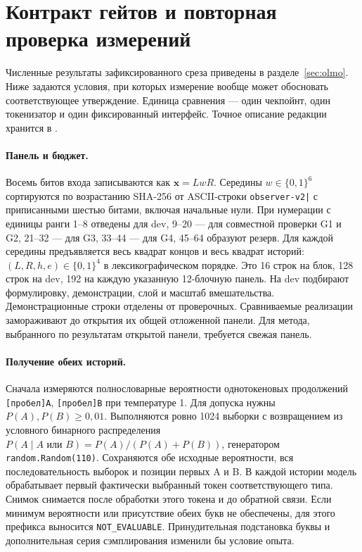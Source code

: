 \section{Контракт гейтов и повторная проверка измерений}
\label{app:gates}

Численные результаты зафиксированного среза приведены в
разделе~\ref{sec:olmo}. Ниже задаются условия, при которых измерение
вообще может обосновать соответствующее утверждение. Единица сравнения ---
один чекпойнт, один токенизатор и один фиксированный интерфейс.
Точное описание редакции хранится в
.

\paragraph{Панель и бюджет.}
Восемь битов входа записываются как $\mathbf{x}=LwR$.
Середины $w\in\{0,1\}^6$ сортируются по возрастанию SHA-256 от ASCII-строки
\verb!observer-v2|! с приписанными шестью битами, включая начальные нули.
При нумерации с единицы ранги 1--8 отведены для dev, 9--20 --- для
совместной проверки G1 и G2, 21--32 --- для G3, 33--44 --- для G4,
45--64 образуют резерв. Для каждой середины предъявляется весь квадрат
концов и весь квадрат историй: $(L,R,h,e)\in\{0,1\}^4$ в лексикографическом
порядке. Это 16 строк на блок, 128 строк на dev, 192 на каждую указанную
12-блочную панель. На dev подбирают формулировку, демонстрации, слой и
масштаб вмешательства. Демонстрационные строки отделены от проверочных.
Сравниваемые реализации замораживают до открытия их общей отложенной панели.
Для метода, выбранного по результатам открытой панели, требуется свежая
панель.

\paragraph{Получение обеих историй.}
Сначала измеряются полнословарные вероятности однотокеновых продолжений
\texttt{[пробел]A}, \texttt{[пробел]B} при температуре 1.
Для допуска нужны $P(A),P(B)\ge 0{,}01$. Выполняются ровно 1024 выборки
с возвращением из условного бинарного распределения
$P(A\mid A\text{ или }B)=P(A)/(P(A)+P(B))$, генератором
\texttt{random.Random(110)}. Сохраняются обе исходные вероятности, вся
последовательность выборок и позиции первых A и B. В каждой истории модель
обрабатывает первый фактически выбранный токен соответствующего типа.
Снимок снимается после обработки этого токена и до обратной связи. Если
минимум вероятности или присутствие обеих букв не обеспечены, для этого
префикса выносится \texttt{NOT\_EVALUABLE}. Принудительная подстановка
буквы и дополнительная серия сэмплирования изменили бы условие опыта.

